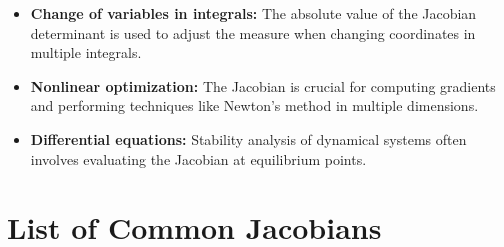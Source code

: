 \begin{itemize}
  
    \item \textbf{Change of variables in integrals:} The absolute value of the Jacobian determinant is 
          used to adjust the measure when changing coordinates in multiple integrals.
  
    \item \textbf{Nonlinear optimization:} The Jacobian is crucial for computing gradients and 
          performing techniques like Newton's method in multiple dimensions.
  
    \item \textbf{Differential equations:} Stability analysis of dynamical systems often involves 
          evaluating the Jacobian at equilibrium points.

\end{itemize}

\section{List of Common Jacobians}

